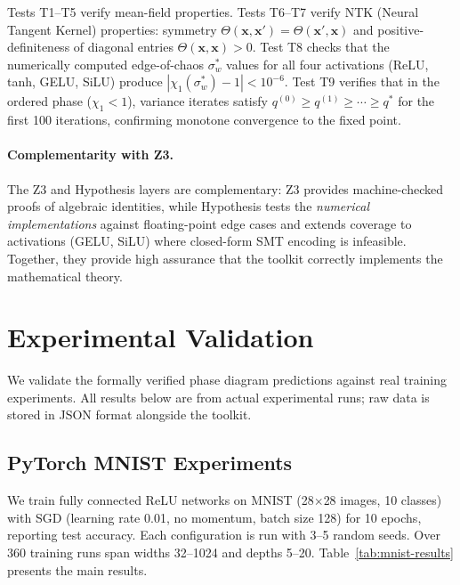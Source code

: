 \documentclass[10pt]{article}
\begin{document}
Tests T1--T5 verify mean-field properties.
Tests T6--T7 verify NTK (Neural Tangent Kernel) properties: symmetry $\Theta(\mathbf{x}, \mathbf{x}') = \Theta(\mathbf{x}', \mathbf{x})$ and positive-definiteness of diagonal entries $\Theta(\mathbf{x}, \mathbf{x}) > 0$.
Test T8 checks that the numerically computed edge-of-chaos $\sigma_w^*$ values for all four activations (ReLU, tanh, GELU, SiLU) produce $|\chi_1(\sigma_w^*) - 1| < 10^{-6}$.
Test T9 verifies that in the ordered phase ($\chi_1 < 1$), variance iterates satisfy $q^{(0)} \geq q^{(1)} \geq \cdots \geq q^*$ for the first 100 iterations, confirming monotone convergence to the fixed point.

\paragraph{Complementarity with Z3.}
The Z3 and Hypothesis layers are complementary: Z3 provides machine-checked proofs of algebraic identities, while Hypothesis tests the \emph{numerical implementations} against floating-point edge cases and extends coverage to activations (GELU, SiLU) where closed-form SMT encoding is infeasible.
Together, they provide high assurance that the toolkit correctly implements the mathematical theory.

\section{Experimental Validation}
\label{sec:experiments}

We validate the formally verified phase diagram predictions against real training experiments.
All results below are from actual experimental runs; raw data is stored in JSON format alongside the toolkit.

\subsection{PyTorch MNIST Experiments}
\label{sec:pytorch}

We train fully connected ReLU networks on MNIST (28$\times$28 images, 10 classes) with SGD (learning rate 0.01, no momentum, batch size 128) for 10 epochs, reporting test accuracy.
Each configuration is run with 3--5 random seeds.
Over 360 training runs span widths 32--1024 and depths 5--20.
Table~\ref{tab:mnist-results} presents the main results.
\end{document}
